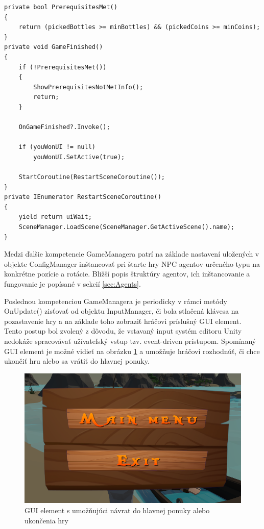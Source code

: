\documentclass[slovak, master]{diploma}
\begin{document}
\vspace{8pt}
\begin{lstlisting}[label=src:FinishGame,caption={Ukončenie hry v prípade výhry hráča}]
private bool PrerequisitesMet()
{
    return (pickedBottles >= minBottles) && (pickedCoins >= minCoins);
}
private void GameFinished()
{
    if (!PrerequisitesMet())
    {
        ShowPrerequisitesNotMetInfo();
        return;
    }

    OnGameFinished?.Invoke();

    if (youWonUI != null)
        youWonUI.SetActive(true);

    StartCoroutine(RestartSceneCoroutine());
}
private IEnumerator RestartSceneCoroutine()
{
    yield return uiWait;
    SceneManager.LoadScene(SceneManager.GetActiveScene().name);
}
\end{lstlisting}

Medzi ďalšie kompetencie GameManagera patrí na základe nastavení uložených v objekte ConfigManager inštancovať pri štarte hry NPC agentov určeného typu na konkrétne pozície a rotácie. Bližší popis štruktúry agentov, ich inštancovanie a fungovanie je popísané v sekcií \ref{sec:Agents}.

Poslednou kompetenciou GameManagera je periodicky v rámci metódy OnUpdate() zisťovať od objektu InputManager, či bola stlačená klávesa na pozastavenie hry a na základe toho zobraziť hráčovi príslušný GUI element. Tento postup bol zvolený z dôvodu, že vstavaný input systém editoru Unity nedokáže spracovávať užívateľský vstup tzv. event-driven prístupom. Spomínaný GUI element je možné vidieť na obrázku \ref{pic:PauseUI} a umožňuje hráčovi rozhodnúť, či chce ukončiť hru alebo sa vrátiť do hlavnej ponuky. 

\begin{figure}[!htbp]
	\centering
	\includegraphics[width=.65\textwidth]{Figures/pauseUI.png}
	\caption{GUI element s umožňujúci návrat do hlavnej ponuky alebo ukončenia hry}
	\label{pic:PauseUI}
\end{figure}
\end{document}

